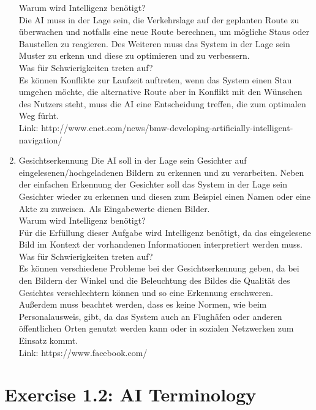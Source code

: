 \documentclass[a4paper]{scrartcl}
\begin{document}
\begin{enumerate}
      Warum wird Intelligenz benötigt? \\
      Die AI muss in der Lage sein, die Verkehrslage auf der geplanten Route zu
      überwachen und notfalls eine neue Route berechnen, um mögliche Staus oder
      Baustellen zu reagieren. Des Weiteren  muss das System in der Lage sein Muster zu erkenn
      und diese zu optimieren und zu verbessern.\\

      Was für Schwierigkeiten treten auf? \\
      Es können Konflikte zur Laufzeit auftreten, wenn das System einen Stau umgehen
      möchte, die alternative Route aber in Konflikt mit den Wünschen des Nutzers steht,
      muss die AI eine Entscheidung treffen, die zum optimalen Weg fürht. \\

      Link: http://www.cnet.com/news/bmw-developing-artificially-intelligent-navigation/ \\

    \item{Gesichtserkennung}
      Die AI soll in der Lage sein Gesichter auf eingelesenen/hochgeladenen Bildern zu erkennen und zu
      verarbeiten. Neben der einfachen Erkennung der Gesichter soll das System in der Lage sein Gesichter
      wieder zu erkennen und diesen zum Beispiel einen Namen oder eine Akte zu zuweisen. Als Eingabewerte
      dienen Bilder. \\

      Warum wird Intelligenz benötigt? \\
      Für die Erfüllung dieser Aufgabe wird Intelligenz benötigt, da das eingelesene
      Bild im Kontext der vorhandenen Informationen interpretiert werden muss. \\

      Was für Schwierigkeiten treten auf? \\
      Es können verschiedene Probleme bei der Gesichtserkennung geben, da bei den Bildern
      der Winkel und die Beleuchtung des Bildes die Qualität des Gesichtes verschlechtern
      können und so eine Erkennung erschweren. Außerdem muss beachtet werden, dass es keine
      Normen, wie beim Personalausweis, gibt, da das System auch an Flughäfen oder anderen
      öffentlichen Orten genutzt werden kann oder in sozialen Netzwerken zum Einsatz kommt. \\

      Link: https://www.facebook.com/ \\

\end{enumerate}


\section*{Exercise 1.2: AI Terminology}
\end{document}

